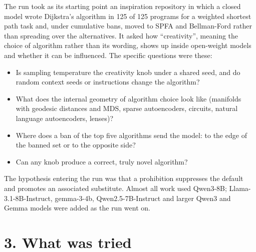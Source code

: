 \documentclass[10pt]{article}
\begin{document}
The run took as its starting point an inspiration repository in which a closed model wrote Dijkstra's algorithm in 125 of 125
programs for a weighted shortest path task and, under cumulative bans, moved to SPFA and Bellman-Ford rather than spreading
over the alternatives. It asked how ``creativity'', meaning the choice of algorithm rather than its wording, shows up inside
open-weight models and whether it can be influenced. The specific questions were these:
\begin{itemize}
\item Is sampling temperature the creativity knob under a shared seed, and do random context seeds or instructions change the
algorithm?
\item What does the internal geometry of algorithm choice look like (manifolds with geodesic distances and MDS, sparse
autoencoders, circuits, natural language autoencoders, lenses)?
\item Where does a ban of the top five algorithms send the model: to the edge of the banned set or to the opposite side?
\item Can any knob produce a correct, truly novel algorithm?
\end{itemize}
The hypothesis entering the run was that a prohibition suppresses the default and promotes an associated substitute. Almost
all work used Qwen3-8B; Llama-3.1-8B-Instruct, gemma-3-4b, Qwen2.5-7B-Instruct and larger Qwen3 and Gemma models were added
as the run went on.

\section*{3. What was tried}
\end{document}
